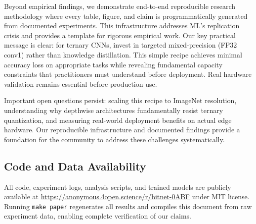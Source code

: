 Beyond empirical findings, we demonstrate end-to-end reproducible research methodology where every table, figure, and claim is programmatically generated from documented experiments. This infrastructure addresses ML's replication crisis and provides a template for rigorous empirical work. Our key practical message is clear: for ternary CNNs, invest in targeted mixed-precision (FP32 conv1) rather than knowledge distillation. This simple recipe achieves minimal accuracy loss on appropriate tasks while revealing fundamental capacity constraints that practitioners must understand before deployment. Real hardware validation remains essential before production use.

Important open questions persist: scaling this recipe to ImageNet resolution, understanding why depthwise architectures fundamentally resist ternary quantization, and measuring real-world deployment benefits on actual edge hardware. Our reproducible infrastructure and documented findings provide a foundation for the community to address these challenges systematically.

\subsection*{Code and Data Availability}

All code, experiment logs, analysis scripts, and trained models are publicly available at \url{https://anonymous.4open.science/r/bitnet-0ABF} under MIT license. Running \texttt{make paper} regenerates all results and compiles this document from raw experiment data, enabling complete verification of our claims.
